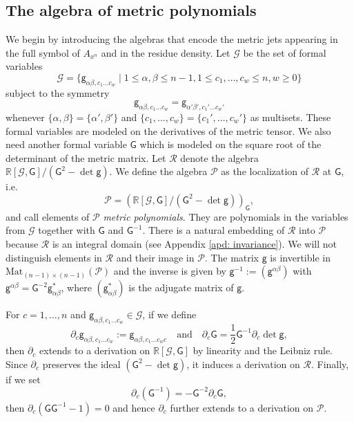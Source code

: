 \documentclass[11pt]{amsart}
\theoremstyle{definition}
\numberwithin{equation}{section}
\begin{document}
\subsection{The algebra of metric polynomials}
We begin by introducing the algebras that encode the metric jets appearing in the full symbol of $A_{x^n}$ and in the residue density. Let $\mathcal G$ be the set of formal variables 
\[\mathcal G=\{\mathsf g_{\alpha\beta,c_1\dots c_w}\mid1\le\alpha,\beta\le n-1,1\le c_1,\dots,c_w\le n, w\ge 0\}\]
subject to the symmetry
\[\mathsf g_{\alpha\beta,c_1\dots c_w} = \mathsf g_{\alpha'\beta',c_1'\dots c_w'}\]
whenever $\{\alpha,\beta\}=\{\alpha',\beta'\}$ and $\{c_1,\dots, c_w\}= \{c_1',\dots, c_w'\}$ as multisets.  
These formal variables are modeled on the derivatives of the metric tensor. We also need another formal variable $\mathsf G$ which is modeled on the square root of the determinant of the metric matrix. 
Let $\mathcal R$ denote the algebra $\mathbb R[\mathcal G,\mathsf G]/(\mathsf G^2 - \det\mathsf g)$. We define the algebra $\mathcal P$ as the localization of $\mathcal R$ at $\mathsf G$, i.e. 
\[\mathcal P = \left(\mathbb R[\mathcal G,\mathsf G]/(\mathsf G^2 - \det\mathsf g)\right)_{\mathsf G},\]
and call elements of $\mathcal P$ {\em metric polynomials}.  They are polynomials in the variables from $\mathcal G$ together with $\mathsf G$ and $\mathsf G^{-1}$.    
There is a natural embedding of $\mathcal R$ into $\mathcal P$ because $\mathcal R$ is an integral domain (see Appendix \ref{apd: invariance}). We will not distinguish elements in $\mathcal R$ and their image in $\mathcal P$. 
The matrix $\mathsf g$ is invertible in $\mathrm{Mat}_{(n-1)\times(n-1)}(\mathcal P)$ and the inverse is given by $\mathsf g^{-1}:=(\mathsf g^{\alpha\beta})$ with $\mathsf g^{\alpha\beta} = \mathsf G^{-2}\mathsf g^*_{\alpha\beta}$, where $(\mathsf g^*_{\alpha\beta})$ is the adjugate matrix of $\mathsf g$.

For $c = 1,\dots,n$ and $\mathsf g_{\alpha\beta,c_1\dots c_w}\in\mathcal G$, if we define
\[\partial_c\mathsf g_{\alpha\beta,c_1\dots c_w} := \mathsf g_{\alpha\beta,c_1\dots c_wc}\quad\text{and}\quad \partial_c\mathsf G = \frac{1}{2}\mathsf G^{-1}\partial_c\det\mathsf g,\]
then $\partial_c$ extends to a derivation on $\mathbb R[\mathcal G,\mathsf G]$ by linearity and the Leibniz rule. Since $\partial_c$ preserves the ideal $(\mathsf G^2-\det\mathsf g)$, it induces a derivation on $\mathcal R$. Finally, if we set
\[\partial_c(\mathsf G^{-1}) = -\mathsf G^{-2}\partial_c\mathsf G,\]
then $\partial_c(\mathsf G\mathsf G^{-1}-1)=0$ and hence $\partial_c$ further extends to a derivation on $\mathcal P$.
\end{document}
